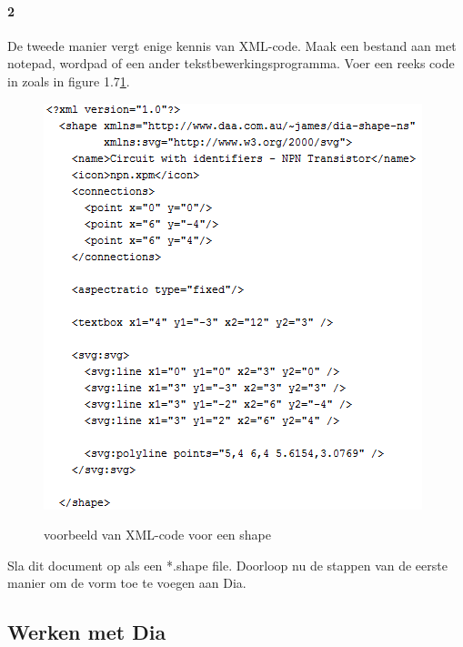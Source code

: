\documentclass[12pt,a4paper]{report}
\begin{document}
\begin{flushleft}
\paragraph*{2}
De tweede manier vergt enige kennis van XML-code. 
Maak een bestand aan met notepad, wordpad of een ander tekstbewerkingsprogramma.
Voer een reeks code in zoals in figure 1.7\ref{shape_04}.
\begin{figure}[H]
\includegraphics[scale=1]{images/shape_04.png}
\label{shape_04}
\centering 
\vspace{-10pt}
\caption{voorbeeld van XML-code voor een shape}
\end{figure}
Sla dit document op als een *.shape file. Doorloop nu de stappen van de eerste manier om de vorm toe te voegen aan Dia.
\pagebreak
\subsection{Werken met Dia}

\end{flushleft}
\end{document}
